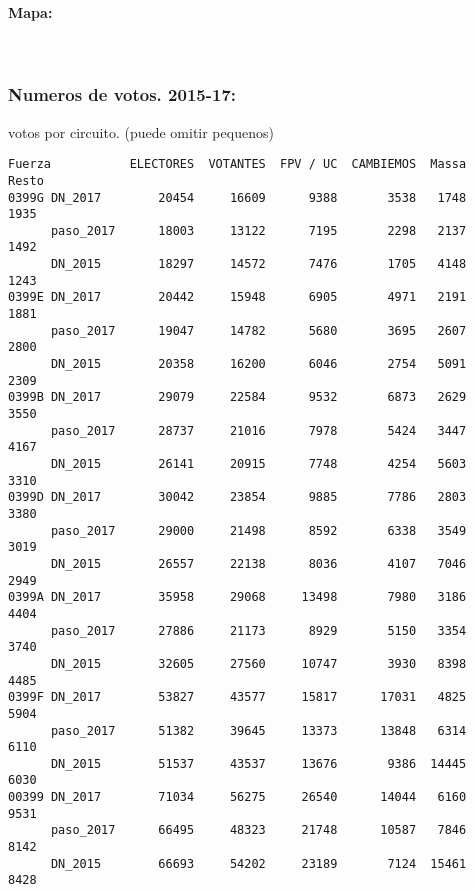 \documentclass[11pt]{article}
\begin{document}
    
    \hypertarget{mapa}{%
\paragraph{Mapa:}\label{mapa}}

    
    \begin{center}
    \end{center}
    { \hspace*{\fill} \\}
    
    \hypertarget{numeros-de-votos.-2015-17}{%
\subsubsection{Numeros de votos.
2015-17:}\label{numeros-de-votos.-2015-17}}

    
    votos por circuito. (puede omitir pequenos)

    
    
    \begin{verbatim}
Fuerza           ELECTORES  VOTANTES  FPV / UC  CAMBIEMOS  Massa  Resto
0399G DN_2017        20454     16609      9388       3538   1748   1935
      paso_2017      18003     13122      7195       2298   2137   1492
      DN_2015        18297     14572      7476       1705   4148   1243
0399E DN_2017        20442     15948      6905       4971   2191   1881
      paso_2017      19047     14782      5680       3695   2607   2800
      DN_2015        20358     16200      6046       2754   5091   2309
0399B DN_2017        29079     22584      9532       6873   2629   3550
      paso_2017      28737     21016      7978       5424   3447   4167
      DN_2015        26141     20915      7748       4254   5603   3310
0399D DN_2017        30042     23854      9885       7786   2803   3380
      paso_2017      29000     21498      8592       6338   3549   3019
      DN_2015        26557     22138      8036       4107   7046   2949
0399A DN_2017        35958     29068     13498       7980   3186   4404
      paso_2017      27886     21173      8929       5150   3354   3740
      DN_2015        32605     27560     10747       3930   8398   4485
0399F DN_2017        53827     43577     15817      17031   4825   5904
      paso_2017      51382     39645     13373      13848   6314   6110
      DN_2015        51537     43537     13676       9386  14445   6030
00399 DN_2017        71034     56275     26540      14044   6160   9531
      paso_2017      66495     48323     21748      10587   7846   8142
      DN_2015        66693     54202     23189       7124  15461   8428
    \end{verbatim}
\end{document}
